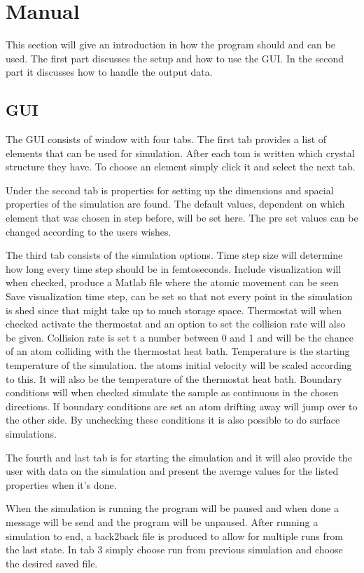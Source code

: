 \section{Manual}
This section will give an introduction in how the program should and can be used. The first part discusses the setup and how to use the GUI. In the second part it discusses how to handle the output data.
	\subsection{GUI}
The GUI consists of window with four tabs. The first tab provides a list of elements that can be used for simulation. After each tom is written which crystal structure they have. To choose an element simply click it and select the next tab.

Under the second tab is properties for setting up the dimensions and spacial properties of the simulation are found. The default values, dependent on which element  that was chosen in step before, will be set here. The pre set values can be changed according to the users wishes.

The third tab consists of the simulation options. 
	Time step size will determine how long every time step should be in femtoseconds.
	Include visualization will when checked, produce a Matlab file  where the atomic movement can be seen
	Save visualization time step, can be set so that not every point in the simulation is shed since that might take up to much storage space.
	Thermostat will when checked activate the thermostat and an option to set the collision rate will also be given.
	Collision rate is set t a number between 0 and 1 and will be the chance of an atom colliding with the thermostat heat bath.
	Temperature is the starting temperature of the simulation. the atoms initial velocity will be scaled according to this. It will also be the temperature of the thermostat heat bath.
	Boundary conditions will when checked simulate the sample as continuous in the chosen directions. If boundary conditions are set an atom drifting away will jump over to the other side. By unchecking these conditions it is also possible to do surface simulations.
	
The fourth and last tab is for starting the simulation and it will also provide the user with data on the simulation and present the average values for the listed properties when it's done.

When the simulation is running the program will be paused and when done a message will be send and the program will be unpaused. After running a simulation to end, a back2back file is produced to allow for multiple runs from the last state. In tab 3 simply choose run from previous simulation and choose the desired saved file.

